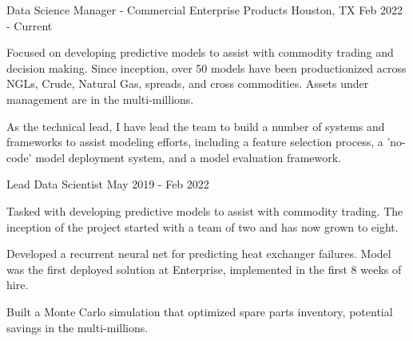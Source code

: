 
\begin{cventries}

\cventry
{Data Science Manager - Commercial} %
{Enterprise Products} %
{Houston, TX} %
{Feb 2022 - Current} %
{ %
\begin{cvitems}
\item {Focused on developing predictive models to assist with commodity trading and decision making. Since inception, over 50 models have been productionized across NGLs, Crude, Natural Gas, spreads, and cross commodities. Assets under management are in the multi-millions.}
\item {As the technical lead, I have lead the team to build a number of systems and frameworks to assist modeling efforts, including a feature selection process, a 'no-code' model deployment system, and a model evaluation framework.}
\end{cvitems}
}

\cventry
{Lead Data Scientist} %
{} %
{} %
{May 2019 - Feb 2022} %
{ %
\begin{cvitems}
\item {Tasked with developing predictive models to assist with commodity trading. The inception of the project started with a team of two and has now grown to eight.}
\item {Developed a recurrent neural net for predicting heat exchanger failures. Model was the first deployed solution at Enterprise, implemented in the first 8 weeks of hire.}
\item {Built a Monte Carlo simulation that optimized spare parts inventory, potential savings in the multi-millions.}
\end{cvitems}
}



\end{cventries}
